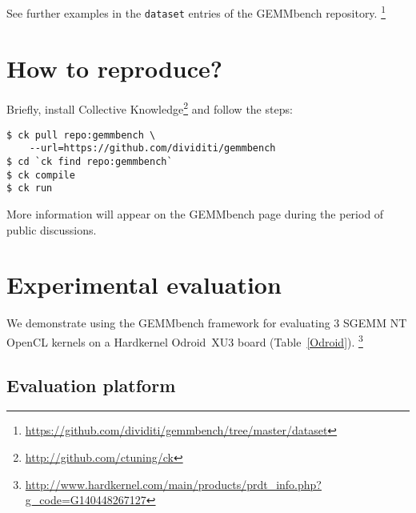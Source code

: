 \documentclass{acm_proc_article-sp} %
\begin{document}
See further examples in the {\tt dataset} entries of the GEMMbench repository.%
\footnote{\url{https://github.com/dividiti/gemmbench/tree/master/dataset}}


\section{How to reproduce?}

Briefly, install Collective Knowledge\footnote{\url{http://github.com/ctuning/ck}}
and follow the steps:
%
\begin{verbatim}
$ ck pull repo:gemmbench \
    --url=https://github.com/dividiti/gemmbench
$ cd `ck find repo:gemmbench`
$ ck compile
$ ck run
\end{verbatim}
%
More information will appear on the GEMMbench page during the period of public discussions.


\section{Experimental evaluation}

We demonstrate using the GEMMbench framework for evaluating 3 SGEMM NT
OpenCL kernels on a Hardkernel Odroid~XU3 board (Table~\ref{Odroid}).%
\footnote{\url{http://www.hardkernel.com/main/products/prdt_info.php?g_code=G140448267127}}

\subsection{Evaluation platform}
\end{document}
